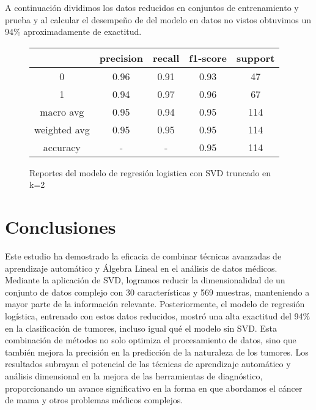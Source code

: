\documentclass[a4paper,10pt,twocolumn]{article}
\begin{document}
A continuación dividimos los datos reducidos en conjuntos de entrenamiento y prueba y al calcular el desempeño de del modelo en datos no vistos obtuvimos un 94\% aproximadamente de exactitud.
	\begin{figure}[h!]%
		\begin{center}
			\begin{tabular}{|c|c|c|c|c|} \hline
			 			& precision 	& recall& f1-score &support	\\ \hline
			0 			&  	0.96		& 0.91 	&0.93	&47	\\ \hline
			1			& 	0.94		& 0.97	&0.96&67	\\ \hline
    
   macro avg 			&  	0.95		& 0.94 	&0.95	&114	\\ \hline
			weighted avg			& 0.95	& 0.95	&0.95&114	\\ \hline
   accuracy &- &-& 0.95&114\\ \hline
			\end{tabular}
		\caption{Reportes del modelo de regresión logistica con SVD truncado en k=2 \label{fig:ex}}
		\end{center}
		\end{figure}
   
\section{Conclusiones}
Este estudio ha demostrado la eficacia de combinar técnicas avanzadas de aprendizaje automático y Álgebra Lineal en el análisis de datos médicos. Mediante la aplicación de SVD, logramos reducir la dimensionalidad de un conjunto de datos complejo con 30 características y 569 muestras, manteniendo a mayor parte de la información relevante. Posteriormente, el modelo de regresión logística, entrenado con estos datos reducidos, mostró una alta exactitud del 94\% en la clasificación de tumores, incluso igual qué el modelo sin SVD. Esta combinación de métodos no solo optimiza el procesamiento de datos, sino que también mejora la precisión en la predicción de la naturaleza de los tumores. Los resultados subrayan el potencial de las técnicas de aprendizaje automático y análisis dimensional en la mejora de las herramientas de diagnóstico, proporcionando un avance significativo en la forma en que abordamos el cáncer de mama y otros problemas médicos complejos.

		
\end{document}
